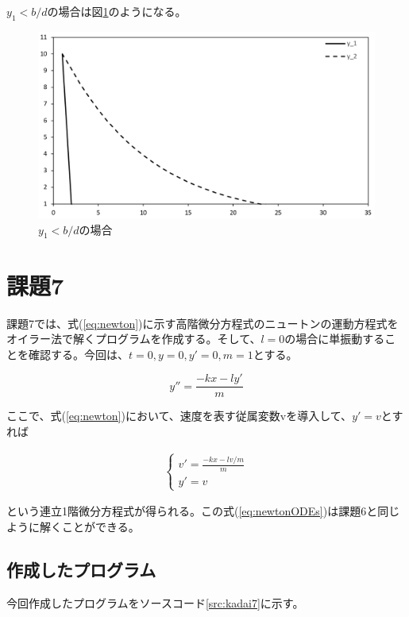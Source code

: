 \documentclass[11pt,titlepage]{jsarticle}
\begin{document}
$y_1 < b/d$の場合は図\ref{fig:y1<b/d}のようになる。
\begin{figure}[H]
\centering
\includegraphics[width=12cm]{img/y1small_bd.png}
\caption{$y_1 < b/d$の場合}
\label{fig:y1<b/d}
\end{figure}

\section{課題7}
課題7では、式(\ref{eq:newton})に示す高階微分方程式のニュートンの運動方程式をオイラー法で解くプログラムを作成する。そして、$l=0$の場合に単振動することを確認する。今回は、$t=0, y=0, y'=0, m=1$とする。

\begin{equation}
\label{eq:newton}
	y''=\frac{-kx-ly'}{m}
\end{equation}

ここで、式(\ref{eq:newton})において、速度を表す従属変数vを導入して、$y'=v$とすれば

\begin{eqnarray}
\label{eq:newtonODEs}
	\left\{
		\begin{array}{l}
			v'=\frac{-kx-lv/m}{m}\\
			y'=v
		\end{array}
	\right.
\end{eqnarray}

という連立1階微分方程式が得られる。この式(\ref{eq:newtonODEs})は課題6と同じように解くことができる。

\subsection{作成したプログラム}
今回作成したプログラムをソースコード\ref{src:kadai7}に示す。


\end{document}
